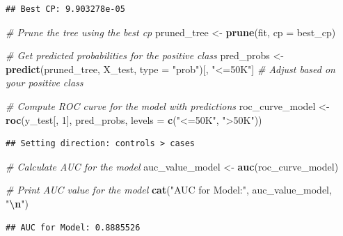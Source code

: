 \documentclass[
]{article}
\newenvironment{Shaded}{\begin{snugshade}}{\end{snugshade}}
\newcommand{\AttributeTok}[1]{\textcolor[rgb]{0.13,0.29,0.53}{#1}}
\newcommand{\CommentTok}[1]{\textcolor[rgb]{0.56,0.35,0.01}{\textit{#1}}}
\newcommand{\DecValTok}[1]{\textcolor[rgb]{0.00,0.00,0.81}{#1}}
\newcommand{\FunctionTok}[1]{\textcolor[rgb]{0.13,0.29,0.53}{\textbf{#1}}}
\newcommand{\NormalTok}[1]{#1}
\newcommand{\OtherTok}[1]{\textcolor[rgb]{0.56,0.35,0.01}{#1}}
\newcommand{\SpecialCharTok}[1]{\textcolor[rgb]{0.81,0.36,0.00}{\textbf{#1}}}
\newcommand{\StringTok}[1]{\textcolor[rgb]{0.31,0.60,0.02}{#1}}
\begin{document}
\begin{verbatim}
## Best CP: 9.903278e-05
\end{verbatim}

\begin{Shaded}
\begin{Highlighting}[]
\CommentTok{\# Prune the tree using the best cp}
\NormalTok{pruned\_tree }\OtherTok{\textless{}{-}} \FunctionTok{prune}\NormalTok{(fit, }\AttributeTok{cp =}\NormalTok{ best\_cp)}

\CommentTok{\# Get predicted probabilities for the positive class}
\NormalTok{pred\_probs }\OtherTok{\textless{}{-}} \FunctionTok{predict}\NormalTok{(pruned\_tree, X\_test, }\AttributeTok{type =} \StringTok{"prob"}\NormalTok{)[, }\StringTok{"\textless{}=50K"}\NormalTok{]  }\CommentTok{\# Adjust based on your positive class}

\CommentTok{\# Compute ROC curve for the model with predictions}
\NormalTok{roc\_curve\_model }\OtherTok{\textless{}{-}} \FunctionTok{roc}\NormalTok{(y\_test[, }\DecValTok{1}\NormalTok{], pred\_probs, }\AttributeTok{levels =} \FunctionTok{c}\NormalTok{(}\StringTok{"\textless{}=50K"}\NormalTok{, }\StringTok{"\textgreater{}50K"}\NormalTok{))}
\end{Highlighting}
\end{Shaded}

\begin{verbatim}
## Setting direction: controls > cases
\end{verbatim}

\begin{Shaded}
\begin{Highlighting}[]
\CommentTok{\# Calculate AUC for the model}
\NormalTok{auc\_value\_model }\OtherTok{\textless{}{-}} \FunctionTok{auc}\NormalTok{(roc\_curve\_model)}

\CommentTok{\# Print AUC value for the model}
\FunctionTok{cat}\NormalTok{(}\StringTok{"AUC for Model:"}\NormalTok{, auc\_value\_model, }\StringTok{"}\SpecialCharTok{\textbackslash{}n}\StringTok{"}\NormalTok{)}
\end{Highlighting}
\end{Shaded}

\begin{verbatim}
## AUC for Model: 0.8885526
\end{verbatim}

\begin{Shaded}
\end{Shaded}
\end{document}
